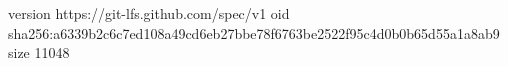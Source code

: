 version https://git-lfs.github.com/spec/v1
oid sha256:a6339b2c6c7ed108a49cd6eb27bbe78f6763be2522f95c4d0b0b65d55a1a8ab9
size 11048
